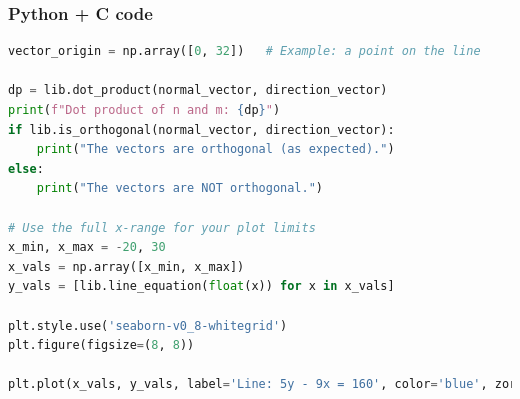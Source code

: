 \documentclass{beamer}
\begin{document}
\begin{frame}[fragile]
    \frametitle{Python + C code}

    \begin{lstlisting}[language=Python]
vector_origin = np.array([0, 32])   # Example: a point on the line

dp = lib.dot_product(normal_vector, direction_vector)
print(f"Dot product of n and m: {dp}")
if lib.is_orthogonal(normal_vector, direction_vector):
    print("The vectors are orthogonal (as expected).")
else:
    print("The vectors are NOT orthogonal.")

# Use the full x-range for your plot limits
x_min, x_max = -20, 30
x_vals = np.array([x_min, x_max])
y_vals = [lib.line_equation(float(x)) for x in x_vals]

plt.style.use('seaborn-v0_8-whitegrid')
plt.figure(figsize=(8, 8))

plt.plot(x_vals, y_vals, label='Line: 5y - 9x = 160', color='blue', zorder=1)
    \end{lstlisting}
\end{frame}
\end{document}
